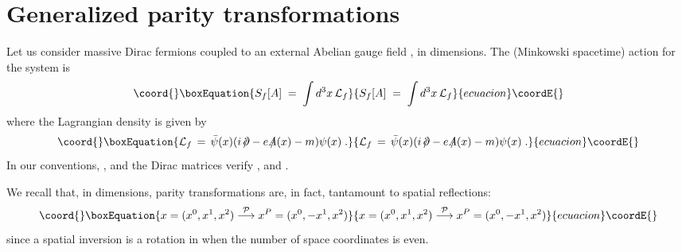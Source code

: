 \documentclass[a4paper,12pt]{article}
\providecommand{\spartial}{/\!\!\!\partial}
\providecommand{\Aslash}{/\!\!\!\!A}
\begin{document}
\section{Generalized parity transformations}\label{sec:sym}
Let us consider massive Dirac fermions coupled to an external Abelian
gauge field \coordHE{}, in \coordHE{} dimensions. The (Minkowski spacetime)
action for the system is
\begin{equation}\coord{}\boxEquation{
S_f[A] \;=\; \int d^3x \, \mathcal{L}_f
}{
S_f[A] \;=\; \int d^3x \, \mathcal{L}_f
}{ecuacion}\coordE{}\end{equation}
where the Lagrangian density \coordHE{} is given by
\begin{equation}\coord{}\boxEquation{
\mathcal{L}_f\,=\,\bar{\psi}(x)(i\,\spartial-e\,\Aslash(x)-m)\psi(x) \;.
}{
\mathcal{L}_f\,=\,\bar{\psi}(x)(i\,\spartial-e\,\Aslash(x)-m)\psi(x) \;.
}{ecuacion}\coordE{}\end{equation}
In our conventions, \coordHE{}, and the
Dirac matrices verify
\mbox{\coordHE{}}, and
\myHighlight{$\gamma_{\mu}^\dagger=\gamma^{\mu}$}\coordHE{}.


We recall that, in \coordHE{} dimensions, parity transformations are, in
fact, tantamount to spatial reflections:
\begin{equation}\coord{}\boxEquation{
\label{parity}
x=(x^0,x^1,x^2)  \stackrel{\mathcal{P}}{\longrightarrow}  x^P=(x^0,-x^1,x^2)
}{
x=(x^0,x^1,x^2)  \stackrel{\mathcal{P}}{\longrightarrow}  x^P=(x^0,-x^1,x^2)
}{ecuacion}\coordE{}\end{equation}
since a spatial inversion is a rotation in \myHighlight{$\pi$}\coordHE{} when the number of
space coordinates is even.
\end{document}
